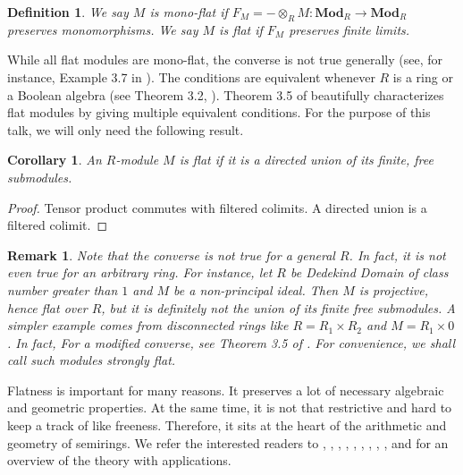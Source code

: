 \documentclass[notitlepage, 10pt]{article}
\theoremstyle{defin}
\newtheorem{defn}{Definition}
\theoremstyle{theo}
\newtheorem{cor}{Corollary}[defn]
\theoremstyle{rema}
\newtheorem{rem}{Remark}[section]
\begin{document}
\begin{defn}
    \label{d:flat}
    We say $M$ is \textit{mono-flat} if $F_M = -\otimes_R M : \mathbf{Mod}_R \to \mathbf{Mod}_R$ preserves monomorphisms. We say $M$ is \textit{flat} if $F_M$ preserves finite limits.
\end{defn}

While all flat modules are mono-flat, the converse is not true generally (see, for instance, Example 3.7 in \cite{katsov2004}). The conditions are equivalent whenever $R$ is a ring or a Boolean algebra (see Theorem 3.2, \cite{katsov2004}). Theorem 3.5 of \cite{borger_jun_semiring} beautifully characterizes flat modules by giving multiple equivalent conditions. For the purpose of this talk, we will only need the following result.

\begin{cor}
    An $R$-module $M$ is flat if it is a directed union of its finite, free submodules.
\end{cor}

\begin{proof}
    Tensor product commutes with filtered colimits. A directed union is a filtered colimit.
\end{proof}

\begin{rem}
    Note that the converse is not true for a general $R$. In fact, it is not even true for an arbitrary ring. For instance, let $R$ be Dedekind Domain of class number greater than $1$ and $M$ be a non-principal ideal. Then $M$ is projective, hence flat over $R$, but it is definitely not the union of its finite free submodules. A simpler example comes from disconnected rings like $R=R_1\times R_2$ and $M = R_1\times 0$. In fact, For a modified converse, see Theorem 3.5 of \cite{borger_jun_semiring}. For convenience, we shall call such modules \textit{strongly flat}.
\end{rem}

Flatness is important for many reasons. It preserves a lot of necessary algebraic and geometric properties. At the same time, it is not that restrictive and hard to keep a track of like freeness. Therefore, it sits at the heart of the arithmetic and geometry of semirings. We refer the interested readers to \cite{Borger2016}, \cite{Borger_2015}, \cite{borger_jun_semiring}, \cite{ConnesConsani2011}, \cite{Zelich2026}, \cite{GualdiKuhrsMayoGarciaXarles2026}, \cite{katsov2004}, \cite{Lorscheid2017},  \cite{MaclaganSturmfels2015}, and \cite{ToenVaquie2009} for an overview of the theory with applications.
\end{document}

